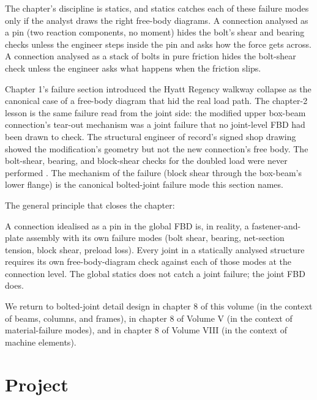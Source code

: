 The chapter's discipline is statics, and statics catches each of
these failure modes only if the analyst draws the right free-body
diagrams. A connection analysed as a pin (two reaction components,
no moment) hides the bolt's shear and bearing checks unless the
engineer steps inside the pin and asks how the force gets across.
A connection analysed as a stack of bolts in pure friction hides
the bolt-shear check unless the engineer asks what happens when the
friction slips.

Chapter 1's failure section introduced the Hyatt Regency walkway
collapse as the canonical case of a free-body diagram that hid the
real load path. The chapter-2 lesson is the same failure read from
the joint side: the modified upper box-beam connection's tear-out
mechanism was a joint failure that no joint-level FBD had been
drawn to check. The structural engineer of record's signed shop
drawing showed the modification's geometry but not the new
connection's free body. The bolt-shear, bearing, and block-shear
checks for the doubled load were never performed
\cite{acc:nbs-hyatt-1982}. The mechanism of the failure (block shear
through the box-beam's lower flange) is the canonical bolted-joint
failure mode this section names.

The general principle that closes the chapter:

\begin{principle}
A connection idealised as a pin in the global FBD is, in reality, a
fastener-and-plate assembly with its own failure modes (bolt shear,
bearing, net-section tension, block shear, preload loss). Every
joint in a statically analysed structure requires its own
free-body-diagram check against each of those modes at the
connection level. The global statics does not catch a joint
failure; the joint FBD does.
\end{principle}

We return to bolted-joint detail design in chapter 8 of this volume
(in the context of beams, columns, and frames), in chapter 8 of
Volume V (in the context of material-failure modes), and in chapter
8 of Volume VIII (in the context of machine elements).

\section{Project}

